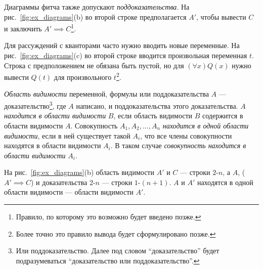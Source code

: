 Диаграммы фитча также допускают {\it поддоказательства}.
На рис.~\ref{fig:ex_diagrams}(b)
во второй строке предполагается $A'$, чтобы вывести $C$ и заключить
${A'\implies C}$\footnote{Правило, по которому это возможно будет введено позже.}.

Для рассуждений с кванторами часто нужно вводить новые переменные.
На рис.~\ref{fig:ex_diagrams}(c) во второй строке вводится произвольная переменная $t$.
Строка с предположением не
обязана быть пустой, но для $(\forall x)Q(x)$ нужно вывести $Q(t)$
для произвольного $t$\footnote{
	Более точно это правило вывода будет сформулировано позже.}.

{\it Область видимости} переменной, формулы или поддоказательства $A$ ---
доказательство\footnote{
	Или поддоказательство. Далее под словом ``доказательство'' будет подразумеваться
	``доказательство или поддоказательство''.}, где $A$ написано,
и поддоказательства этого доказательства. $A$ {\it находится
		в области видимости} $B$, если область видимости $B$
содержится в области видимости $A$.
Совокупность $A_1,A_2,...,A_{n}$ {\it находится в одной области видимости},
если в ней существует такой $A_{i}$, что все члены совокупности находятся в
области видимости $A_{i}$. В таком случае {\it совокупность находится в области
видимости} $A_{i}$.

На рис.~\ref{fig:ex_diagrams}(b) область видимости $A'$ и $C$ --- строки $2$-$n$,
а $A$, (${A'\implies C}$) и доказательства $2$-$n$ --- строки $1$-$(n+1)$.
$A$ и $A'$ находятся в одной области видимости --- области видимости $A'$.

\pagebreak

